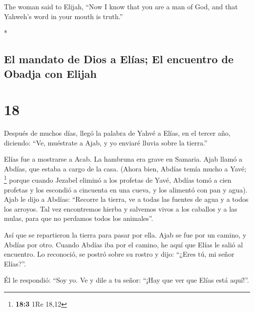 \begin{paracol}{2}
\begin{otherlanguage}{english}
 The woman said to Elijah, ``Now I know that you are a
man of God, and that Yahweh's word in your mouth is truth.''

\end{otherlanguage}

\switchcolumn[0]*

\hypertarget{el-mandato-de-dios-a-eluxedas-el-encuentro-de-obadja-con-elijah}{%
\subsection{El mandato de Dios a Elías; El encuentro de Obadja con
Elijah}\label{el-mandato-de-dios-a-eluxedas-el-encuentro-de-obadja-con-elijah}}

\hypertarget{section-34}{%
\section{18}\label{section-34}}

 Después de muchos días, llegó la palabra de Yahvé a
Elías, en el tercer año, diciendo: ``Ve, muéstrate a Ajab, y yo enviaré
lluvia sobre la tierra.''

 Elías fue a mostrarse a Acab. La hambruna era grave en
Samaria.  Ajab llamó a Abdías, que estaba a cargo de la
casa. (Ahora bien, Abdías temía mucho a Yavé; \footnote{\textbf{18:3}
  1Re 18,12}  porque cuando Jezabel eliminó a los profetas
de Yavé, Abdías tomó a cien profetas y los escondió a cincuenta en una
cueva, y los alimentó con pan y agua).  Ajab le dijo a
Abdías: ``Recorre la tierra, ve a todas las fuentes de agua y a todos
los arroyos. Tal vez encontremos hierba y salvemos vivos a los caballos
y a las mulas, para que no perdamos todos los animales''.

 Así que se repartieron la tierra para pasar por ella.
Ajab se fue por un camino, y Abdías por otro.  Cuando
Abdías iba por el camino, he aquí que Elías le salió al encuentro. Lo
reconoció, se postró sobre su rostro y dijo: ``¿Eres tú, mi señor
Elías?''.

 Él le respondió: ``Soy yo. Ve y dile a tu señor: ``¡Hay
que ver que Elías está aquí!''.


\end{paracol}
